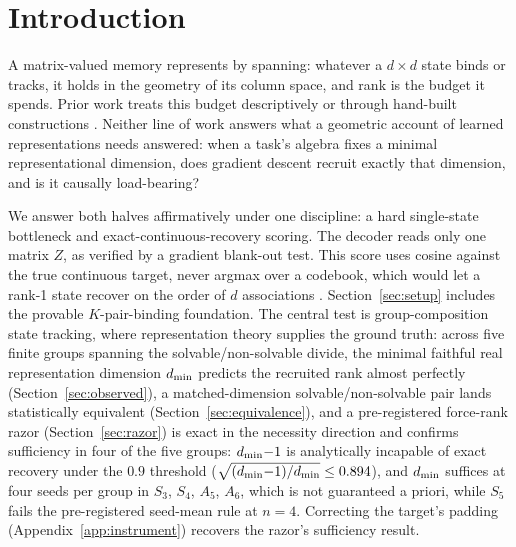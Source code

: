 \section{Introduction}
\label{sec:intro}

A matrix-valued memory represents by spanning: whatever a $d \times d$
state binds or tracks, it holds in the geometry of its column space, and
rank is the budget it spends. Prior work treats this budget
descriptively \citep{nazari2026rank, sun2026staterank} or through
hand-built constructions \citep{nichani2025factual}. Neither line of work answers
what a geometric account of learned representations needs answered:
when a task's algebra fixes a minimal representational dimension, does
gradient descent recruit exactly that dimension, and is it causally
load-bearing?

We answer both halves affirmatively under one discipline: a hard
single-state bottleneck and exact-continuous-recovery scoring. The decoder
reads only one matrix $Z$, as verified by a gradient blank-out test.
This score uses cosine against the true continuous target, never argmax over a
codebook, which would let a rank-1 state recover on the order of $d$
associations \citep{nichani2025factual}.
Section~\ref{sec:setup} includes the provable $K$-pair-binding foundation.
The central test is group-composition state tracking, where representation theory
supplies the ground truth: across five finite groups spanning the
solvable/non-solvable divide, the minimal faithful real representation
dimension $d_{\min}$ predicts the recruited rank almost perfectly
(Section~\ref{sec:observed}), a matched-dimension solvable/non-solvable pair
lands statistically equivalent (Section~\ref{sec:equivalence}),
and a pre-registered force-rank razor (Section~\ref{sec:razor}) is exact in the
necessity direction and confirms sufficiency in four of the five groups:
$d_{\min}{-}1$
is analytically incapable of exact recovery under the $0.9$ threshold
($\sqrt{(d_{\min}{-}1)/d_{\min}} \le 0.894$), and $d_{\min}$ suffices at four
seeds per group in $S_3$, $S_4$, $A_5$, $A_6$, which is not
guaranteed a priori, while $S_5$ fails the pre-registered seed-mean
rule at $n = 4$.
Correcting the target's padding (Appendix~\ref{app:instrument}) recovers the
razor's sufficiency result.
